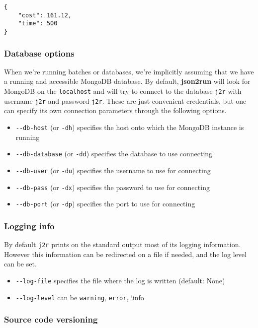 \documentclass[11pt,notitlepage,twoside,a4paper]{article}
\begin{document}
\begin{lstlisting}
{
    "cost": 161.12,
    "time": 500
}
\end{lstlisting}

\subsubsection{Database options}

When we're running batches or databases, we're implicitly assuming that
we have a running and accessible MongoDB database. By default,
\textbf{json2run} will look for MongoDB on the \texttt{localhost} and
will try to connect to the database \texttt{j2r} with username
\texttt{j2r} and password \texttt{j2r}. These are just convenient
credentials, but one can specify its own connection parameters through
the following options.

\begin{itemize}
\item
  \texttt{-{}-db-host} (or \texttt{-dh}) specifies the host onto which
  the MongoDB instance is running
\item
  \texttt{-{}-db-database} (or \texttt{-dd}) specifies the database to
  use connecting
\item
  \texttt{-{}-db-user} (or \texttt{-du}) specifies the username to use
  for connecting
\item
  \texttt{-{}-db-pass} (or \texttt{-dx}) specifies the password to use
  for connecting
\item
  \texttt{-{}-db-port} (or \texttt{-dp}) specifies the port to use for
  connecting
\end{itemize}

\subsubsection{Logging info}

By default \texttt{j2r} prints on the standard output most of its
logging information. However this information can be redirected on a
file if needed, and the log level can be set.

\begin{itemize}
\item
  \texttt{-{}-log-file} specifies the file where the log is written
  (default: None)
\item
  \texttt{-{}-log-level} can be \texttt{warning}, \texttt{error}, `info
\end{itemize}

\subsubsection{Source code versioning}
\end{document}
